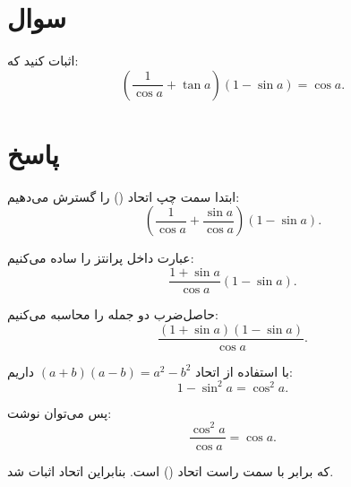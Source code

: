 \documentclass{article}
\begin{document}
\section{سوال}

اثبات کنید که:
\begin{equation}
    \left(\frac{1}{\cos a} + \tan a\right)(1 - \sin a) = \cos a.
\end{equation}

\section{پاسخ}


ابتدا سمت چپ اتحاد () را گسترش می‌دهیم:
\begin{equation}
    \left(\frac{1}{\cos a} + \frac{\sin a}{\cos a}\right)(1 - \sin a).
\end{equation}

عبارت داخل پرانتز را ساده می‌کنیم:
\begin{equation}
    \frac{1 + \sin a}{\cos a} (1 - \sin a).
\end{equation}

حاصل‌ضرب دو جمله را محاسبه می‌کنیم:
\begin{equation}
    \frac{(1 + \sin a)(1 - \sin a)}{\cos a}.
\end{equation}

با استفاده از اتحاد $(a+b)(a-b) = a^2 - b^2$ داریم:
\begin{equation}
    1 - \sin^2 a = \cos^2 a.
\end{equation}

پس می‌توان نوشت:
\begin{equation}
    \frac{\cos^2 a}{\cos a} = \cos a.
\end{equation}

که برابر با سمت راست اتحاد () است. بنابراین اتحاد اثبات شد.
\end{document}
